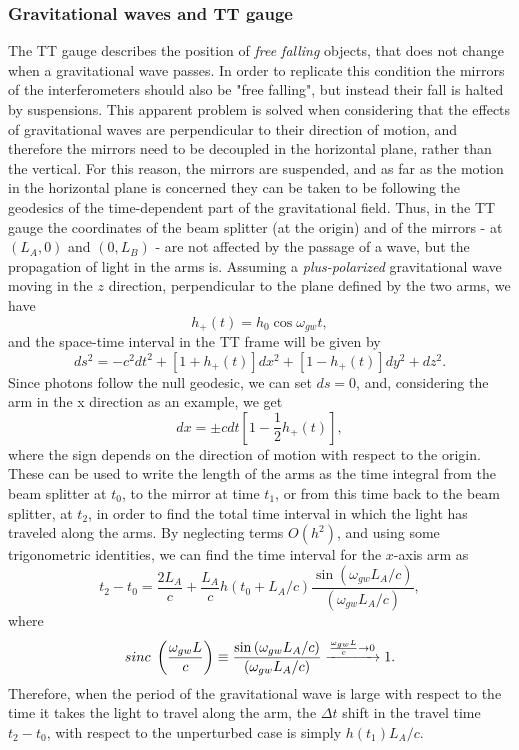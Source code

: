 \subsubsection{Gravitational waves and TT gauge}
The TT gauge describes the position of \textit{free falling} objects, that does not change when a gravitational wave passes. 
In order to replicate this condition the mirrors of the interferometers should also be "free falling", but instead their fall is halted by suspensions.
This apparent problem is solved when considering that the effects of gravitational waves are perpendicular to their direction of motion, and therefore the mirrors need to be decoupled in the horizontal plane, rather than the vertical.
For this reason, the mirrors are suspended, and as far as the motion in the horizontal plane is concerned they can be taken to be following the geodesics of the time-dependent part of the gravitational field.
Thus, in the TT gauge the coordinates of the beam splitter (at the origin) and of the mirrors - at $(L_A,0)$ and $(0,L_B)$ - are not affected by the passage of a wave, but the propagation of light in the arms is.
Assuming a \textit{plus-polarized} gravitational wave moving in the $z$ direction, perpendicular to the plane defined by the two arms, we have 
\[
    h_+(t)=h_0\cos{\omega_{gw}t},
\]
and the space-time interval in the TT frame will be given by
\[
    ds^2= -c^2dt^2 + [1+h_+ (t)]dx^2 + [1- h_+(t)]dy^2 + dz^2.
\]
Since photons follow the null geodesic, we can set $ds=0$, and, considering the arm in the x direction as an example, we get 
\[
    dx = \pm cdt\left[1-\frac{1}{2}h_+(t)\right], 
\]
where the sign depends on the direction of motion with respect to the origin. 
These can be used to write the length of the arms as the time integral from the beam splitter at $t_0$, to the mirror at time $t_1$, or from this time back to the beam splitter, at $t_2$, in order to find the total time interval in which the light has traveled along the arms.
By neglecting terms $O(h^2)$, and using some trigonometric identities, we can find the time interval for the $x$-axis arm as 
\begin{equation}
    t_2-t_0 = \frac{2L_A}{c} + \frac{L_A}{c}h(t_0+L_A/c)\frac{\sin{(\omega_{gw}L_A/c)}}{(\omega_{gw}L_A/c)},
    \label{eq: time interval for x-axis}
\end{equation}
where 
\[
    sinc\hspace{1mm}\left(\frac{\omega_{gw}L}{c}\right) \equiv \frac{\sin{(\omega_{gw}L_A/c)}}{(\omega_{gw}L_A/c)}\xrightarrow{\frac{\omega_{gw}L}{c}\to0}1.
\]
Therefore, when the period of the gravitational wave is large with respect to the time it takes the light to travel along the arm, the $\Delta t$ shift in the travel time $t_2 - t_0$, with respect to the unperturbed case is simply $h(t_1)L_A/c$.
